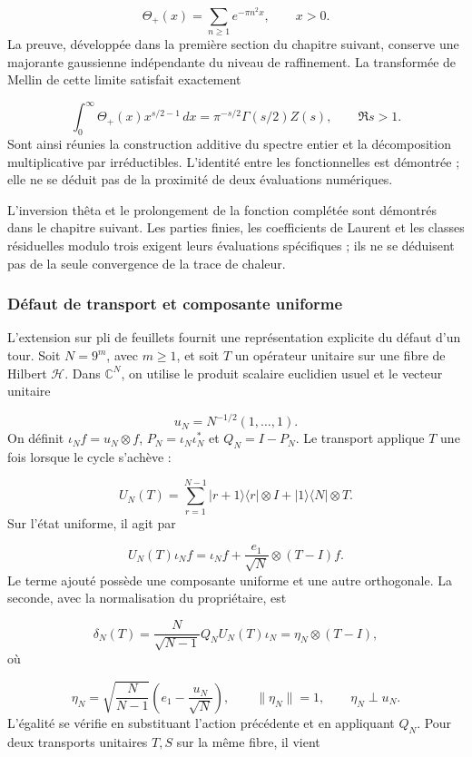 \[
\Theta_+(x)=\sum_{n\ge1}e^{-\pi n^2x},\qquad x>0.
\]
La preuve, développée dans la première section du chapitre suivant, conserve une majorante gaussienne indépendante du niveau de raffinement. La transformée de Mellin de cette limite satisfait exactement

\[
\int_0^\infty\Theta_+(x)x^{s/2-1}\,dx
=\pi^{-s/2}\Gamma(s/2)Z(s),\qquad \Re s>1.
\]
Sont ainsi réunies la construction additive du spectre entier et la décomposition multiplicative par irréductibles. L'identité entre les fonctionnelles est démontrée ; elle ne se déduit pas de la proximité de deux évaluations numériques.

L'inversion thêta et le prolongement de la fonction complétée sont démontrés dans le chapitre suivant. Les parties finies, les coefficients de Laurent et les classes résiduelles modulo trois exigent leurs évaluations spécifiques ; ils ne se déduisent pas de la seule convergence de la trace de chaleur.

\subsubsection*{Défaut de transport et composante uniforme}
L’extension sur pli de feuillets fournit une représentation explicite du défaut d’un tour. Soit \(N=9^m\), avec \(m\ge1\), et soit \(T\) un opérateur unitaire sur une fibre de Hilbert \(\mathcal H\). Dans \(\mathbb C^N\), on utilise le produit scalaire euclidien usuel et le vecteur unitaire

\[
u_N=N^{-1/2}(1,\ldots,1).
\]
On définit \(\iota_Nf=u_N\otimes f\), \(P_N=\iota_N\iota_N^*\) et \(Q_N=I-P_N\). Le transport applique \(T\) une fois lorsque le cycle s'achève :

\[
U_N(T)=\sum_{r=1}^{N-1}|r+1\rangle\langle r|\otimes I
+|1\rangle\langle N|\otimes T.
\]
Sur l'état uniforme, il agit par

\[
U_N(T)\iota_N f
=\iota_N f+\frac{e_1}{\sqrt N}\otimes(T-I)f.
\]
Le terme ajouté possède une composante uniforme et une autre orthogonale. La seconde, avec la normalisation du propriétaire, est

\[
\delta_N(T)=\frac{N}{\sqrt{N-1}}Q_NU_N(T)\iota_N
=\eta_N\otimes(T-I),
\]
où

\[
\eta_N=\sqrt{\frac N{N-1}}\left(e_1-\frac{u_N}{\sqrt N}\right),
\qquad \|\eta_N\|=1,\qquad \eta_N\perp u_N.
\]
L'égalité se vérifie en substituant l'action précédente et en appliquant \(Q_N\). Pour deux transports unitaires \(T,S\) sur la même fibre, il vient

